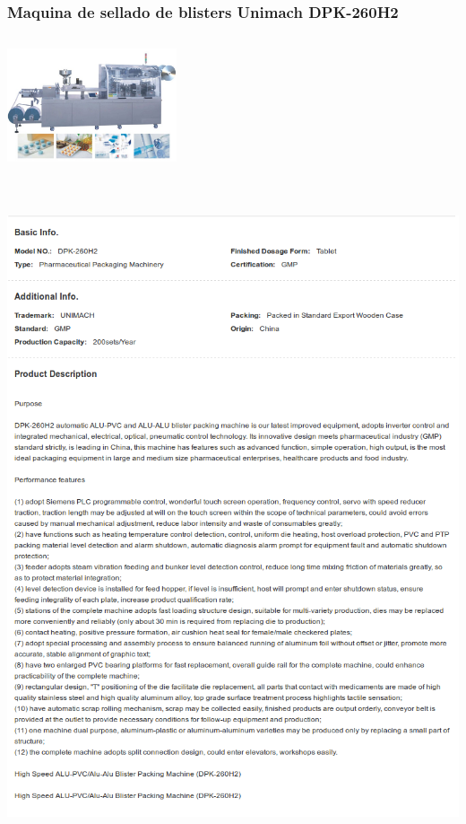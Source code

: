 \subsubsection{Maquina de sellado de blisters Unimach DPK-260H2}
\includegraphics[width=5cm,height=4cm,keepaspectratio]{Datasheets/5Foto.png} 
\\
\includegraphics[width=15cm,height=20cm,keepaspectratio]{Datasheets/5MaquinaBlisters.png} 
\newpage

